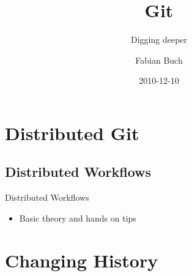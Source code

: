 \documentclass{beamer}
\title[] %
{Git}
\subtitle
{Digging deeper}
\author[] %
{Fabian Buch}
\institute[] %
{Synyx GmbH \& Co. KG}
\date[] %
{2010-12-10}
\begin{document}



\begin{frame}
  \titlepage
\end{frame}







\section{Distributed Git}

\subsection{Distributed Workflows}

\begin{frame}{Distributed Workflows}
  \begin{itemize}
  \item
    Basic theory and hands on tips
  \end{itemize}
\end{frame}

\section{Changing History}
\end{document}
